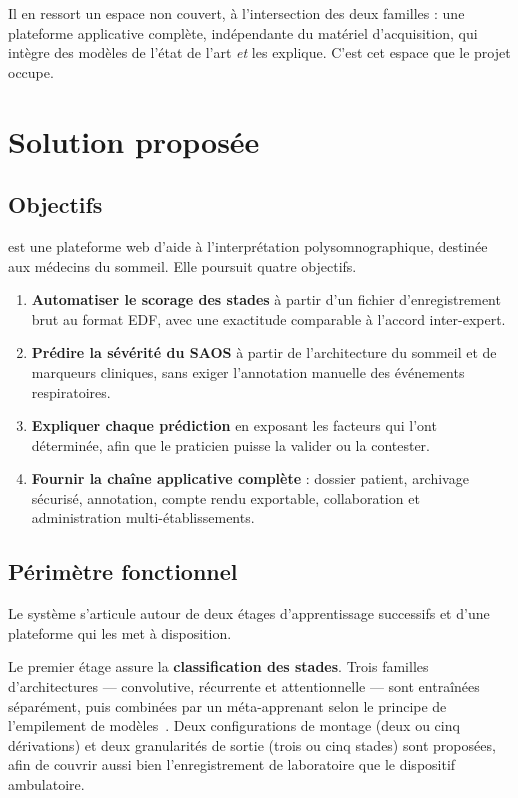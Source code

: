 Il en ressort un espace non couvert, à l'intersection des deux familles : une
plateforme applicative complète, indépendante du matériel d'acquisition, qui intègre
des modèles de l'état de l'art \emph{et} les explique. C'est cet espace que le projet
occupe.

\section{Solution proposée}

\subsection{Objectifs}

\hypnoria{} est une plateforme web d'aide à l'interprétation polysomnographique,
destinée aux médecins du sommeil. Elle poursuit quatre objectifs.

\begin{enumerate}[itemsep=3pt,topsep=4pt]
  \item \textbf{Automatiser le scorage des stades} à partir d'un fichier
        d'enregistrement brut au format EDF, avec une exactitude comparable à
        l'accord inter-expert.
  \item \textbf{Prédire la sévérité du SAOS} à partir de l'architecture du sommeil
        et de marqueurs cliniques, sans exiger l'annotation manuelle des événements
        respiratoires.
  \item \textbf{Expliquer chaque prédiction} en exposant les facteurs qui l'ont
        déterminée, afin que le praticien puisse la valider ou la contester.
  \item \textbf{Fournir la chaîne applicative complète} : dossier patient, archivage
        sécurisé, annotation, compte rendu exportable, collaboration et
        administration multi-établissements.
\end{enumerate}

\subsection{Périmètre fonctionnel}

Le système s'articule autour de deux étages d'apprentissage successifs et d'une
plateforme qui les met à disposition.

Le premier étage assure la \textbf{classification des stades}. Trois familles
d'architectures — convolutive, récurrente et attentionnelle — sont entraînées
séparément, puis combinées par un méta-apprenant selon le principe de l'empilement de
modèles~\cite{wolpert1992}. Deux configurations de montage (deux ou cinq dérivations)
et deux granularités de sortie (trois ou cinq stades) sont proposées, afin de couvrir
aussi bien l'enregistrement de laboratoire que le dispositif ambulatoire.

